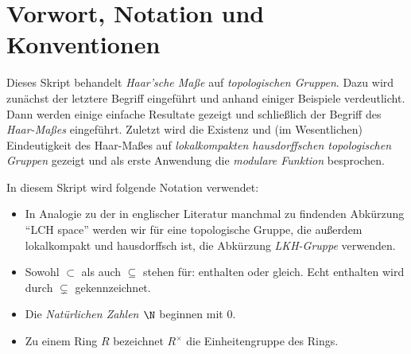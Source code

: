 
\chapter{Vorwort, Notation und Konventionen}
Dieses Skript behandelt \emph{Haar'sche Maße} auf \emph{topologischen Gruppen}.
Dazu wird zunächst der letztere Begriff eingeführt und anhand einiger Beispiele
verdeutlicht. Dann werden einige einfache Resultate gezeigt und schließlich der
Begriff des \emph{Haar-Maßes} eingeführt. Zuletzt wird die Existenz und
(im Wesentlichen) Eindeutigkeit des Haar-Maßes auf \emph{lokalkompakten
hausdorffschen topologischen Gruppen} gezeigt und als erste Anwendung die
\emph{modulare Funktion} besprochen.


\bigskip
In diesem Skript wird folgende Notation verwendet:
\begin{itemize}
    \item
        In Analogie zu der in englischer Literatur manchmal zu findenden
        Abkürzung \enquote{LCH space} werden wir für eine topologische Gruppe,
        die außerdem lokalkompakt und hausdorffsch ist, die Abkürzung
        \emph{LKH-Gruppe} verwenden.
        
    \item
        Sowohl $\subset$ als auch $\subseteq$ stehen für: enthalten oder gleich.
        Echt enthalten wird durch $\subsetneq$ gekennzeichnet.
    
    \item
        Die \emph{Natürlichen Zahlen $\N$} beginnen mit $0$.
    
    \item
        Zu einem Ring $R$ bezeichnet $R^\times$ die Einheitengruppe des Rings.
\end{itemize}


